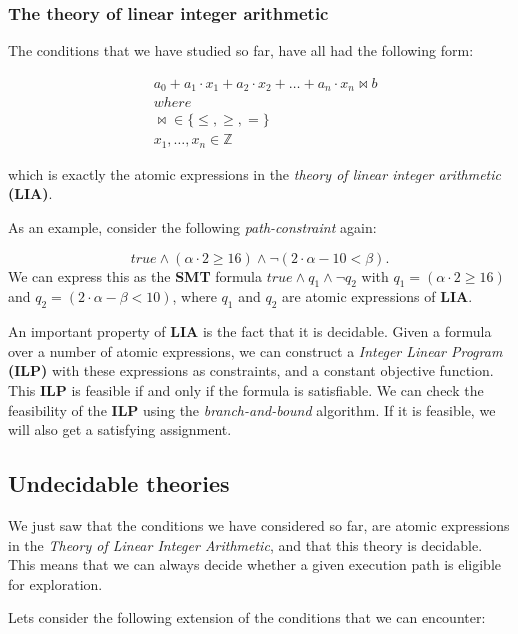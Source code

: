 	\subsubsection{The theory of linear integer arithmetic}
		The conditions that we have studied so far, have all had the following form:
		
		\begin{align*}
			& a_0 +  a_1 \cdot x_1 + a_2\cdot x_2 + \ldots + a_n \cdot x_n \bowtie b\\
			& where\\
			& \bowtie \in \{\leq, \geq, =\}\\
			& x_1, \ldots, x_n \in \mathbb{Z}			
		\end{align*}
		
	which is exactly the atomic expressions in the \emph{theory of linear integer arithmetic} \textbf{(LIA)}. 
	
	As an example, consider the following \emph{path-constraint} again:
	
	\begin{equation}
		true \land (\alpha \cdot 2 \geq 16) \land \neg (2\cdot \alpha - 10 < \beta).
	\end{equation}	
	We can express this as the \textbf{SMT} formula $true \land q_1 \land \neg q_2$ with $q_1 = (\alpha \cdot 2 \geq 16)$ and $q_2 = (2\cdot \alpha - \beta < 10)$, where $q_1$ and $q_2$ are atomic expressions of \textbf{LIA}.
	
	An important property of \textbf{LIA} is the fact that it is decidable. Given a formula over a number of atomic expressions, we can construct a \emph{Integer Linear Program} \textbf{(ILP)} with these expressions as constraints, and a constant objective function. This \textbf{ILP} is feasible if and only if the formula is satisfiable. We can check the feasibility of the \textbf{ILP} using the \emph{branch-and-bound} algorithm. If it is feasible, we will also get a satisfying assignment. 
	
	\subsection{Undecidable theories}
	
	We just saw that the conditions we have considered so far, are atomic expressions in the \emph{Theory of Linear Integer Arithmetic}, and that this theory is decidable. This means that we can always decide whether a given execution path is eligible for exploration.
	 
	Lets consider the following extension of the conditions that we can encounter:
	
